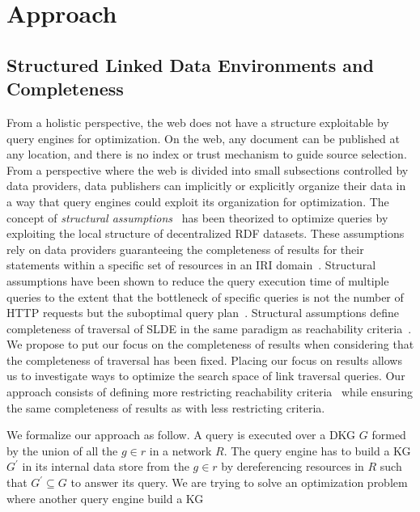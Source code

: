 \section{Approach}



\subsection{Structured Linked Data Environments and Completeness}\label{sec:slde}
From a holistic perspective, the web does not have a structure exploitable by query engines for optimization.
On the web, any document can be published at any location, and there is no index or trust mechanism to guide source selection.
From a perspective where the web is divided into small subsections controlled by data providers, data publishers can implicitly or explicitly organize their data  
in a way that query engines could exploit its organization for optimization.
The concept of \emph{structural assumptions}~\cite{Taelman2023} has been theorized to optimize queries by exploiting the local structure of decentralized RDF datasets.
These assumptions rely on data providers guaranteeing the completeness of results for their statements within a specific set of resources in an IRI domain~\cite{Bogaerts2021LinkTW}.
Structural assumptions have been shown to reduce the query execution time of multiple queries to the extent that the bottleneck of specific queries is not the number of HTTP requests but the suboptimal query plan~\cite{Taelman2023, eschauzier_quweda_linkqueue_2023}.
Structural assumptions define completeness of traversal of SLDE in the same paradigm as reachability criteria~\cite{Hartig2012}.
We propose to put our focus on the completeness of results when considering that the completeness of traversal has been fixed.
Placing our focus on results allows us to investigate ways to optimize the search space of link traversal queries.
Our approach consists of defining more restricting reachability criteria~\cite{Hartig2012} while ensuring the same completeness of results as with less restricting criteria.

We formalize our approach as follow.
A query is executed over a DKG $G$ formed by the union of all the $g \in r$ in a network $R$.
The query engine has to build a KG $G^{\prime}$ in its internal data store from the  $g \in r$ by dereferencing resources in $R$ such that
$G^{\prime} \subseteq G$ to answer its query.
We are trying to solve an optimization problem where another query engine build a KG

